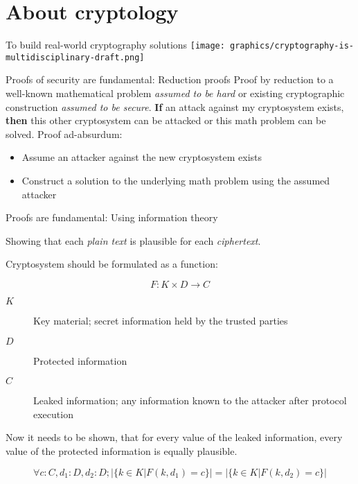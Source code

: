 \section{About cryptology}

\begin{frame}{To build real-world cryptography solutions}
  \centering
  \texttt{[image: graphics/cryptography-is-multidisciplinary-draft.png]}
\end{frame}

\begin{frame}{Proofs of security are fundamental: Reduction proofs}
  \small
  Proof by reduction to a well-known mathematical problem \emph{assumed to be hard} or existing cryptographic construction \emph{assumed to be secure}.
  \vfill
  \textbf{If} an attack against my cryptosystem exists,
  \\ \textbf{then} this other cryptosystem can be attacked or this math problem can be solved.
  \vfill
  Proof ad-absurdum:
  \begin{itemize}
    \item Assume an attacker against the new cryptosystem exists
    \item Construct a solution to the underlying math problem using the assumed attacker
  \end{itemize}
\end{frame}

\begin{frame}{Proofs are fundamental: Using information theory}
  \small

  Showing that each \emph{plain text} is plausible for each \emph{ciphertext}.

  \vfill

  Cryptosystem should be formulated as a function:

  $$F : K \times D \to C$$

  \begin{description}
    \item[$K$] Key material; secret information held by the trusted parties
    \item[$D$] Protected information
    \item[$C$] Leaked information; any information known to the attacker after protocol execution
  \end{description}

  Now it needs to be shown, that for every value of the leaked information,
  every value of the protected information is equally plausible.


  $$\forall c : C, d_1 : D, d_2 : D; |\{ k \in K | F(k, d_1) = c \}| = |\{ k \in K | F(k, d_2) = c \}|$$
\end{frame}

